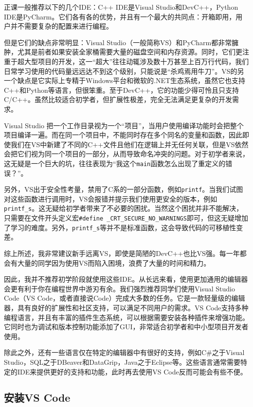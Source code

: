 正课一般推荐以下的几个IDE：C++ IDE是Visual Studio和DevC++，Python IDE是PyCharm。它们各有各的优势，并且有一个最大的共同点：开箱即用，用户并不需要复杂的配置来进行编程。

但是它们的缺点非常明显：Visual Studio（一般简称VS）和PyCharm都非常臃肿，尤其是前者如果安装全家桶需要大量的磁盘空间和内存资源。同时，它们更注重于超大型项目的开发，这一“超大”往往动辄涉及数十万甚至上百万行代码，我们日常学习使用的代码量远远达不到这个级别，只能说是“杀鸡焉用牛刀”。VS的另一个缺点是它实际上专精于Windows平台和微软的.NET生态系统，虽然它也支持C++和Python等语言，但很笨重。至于DevC++，它的功能少得可怜且只支持C/C++。虽然比较适合初学者，但扩展性极差，完全无法满足更复杂的开发需求。

\begin{note}
  Visual Studio 把一个工作目录视为一个“项目”，当用户使用编译功能时会把整个项目编译一遍。而在同一个项目中，不能同时存在多个同名的变量和函数，因此即使我们在VS中新建了不同的C++文件且他们在逻辑上并无任何关联，但是VS依然会把它们视为同一个项目的一部分，从而导致命名冲突的问题。对于初学者来说，这无疑是一个巨大的坑，往往表现为“我这个\texttt{main}函数怎么出现了重定义的错误？”。

  另外，VS出于安全性考量，禁用了C系的一部分函数，例如\texttt{printf}。当我们试图对这些函数进行调用时，VS会报错并提示我们使用更安全的版本，例如\texttt{printf\_s}。这无疑给初学者带来了不必要的困扰。当然这个困扰并非不能解决，只需要在文件开头定义宏\texttt{\#define \_CRT\_SECURE\_NO\_WARNINGS}即可，但这无疑增加了学习的难度。另外，\texttt{printf\_s}等并不是标准函数，这会导致代码的可移植性变差。

  综上所述，我非常建议新手远离VS，即使是简陋的DevC++也比VS强。每一年都会有大量的同学因为使用VS而陷入困境，浪费了大量的时间和精力。
\end{note}

因此，我并不推荐初学阶段就使用这些IDE。从长远来看，使用更加通用的编辑器会更有利于你在编程世界中游刃有余。我们强烈推荐同学们使用Visual Studio Code（VS Code，或者直接说Code）完成大多数的任务。它是一款轻量级的编辑器，具有良好的扩展性和社区支持，可以满足不同用户的需求。VS Code支持多种编程语言，并且有丰富的插件生态系统，可以根据需要安装各种插件来增强功能。它同时也为调试和版本控制功能添加了GUI，非常适合初学者和中小型项目开发者使用。

除此之外，还有一些语言仅在特定的编辑器中有很好的支持，例如C\#之于Visual Studio，SQL之于DBeaver和DataGrip，Java之于Eclipse等。这些语言通常需要特定的IDE来提供更好的支持和功能，此时再去使用VS Code反而可能会有些不便。

\subsection{安装VS Code}

